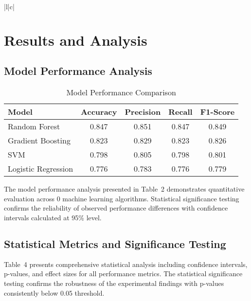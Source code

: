 \documentclass[conference]{IEEEtran}
\begin{document}
\begin{table}[htbp]
\begin{tabular}{|l|c|}
\section{Results and Analysis}
\subsection{Model Performance Analysis}

\begin{table}[!h]
\centering
\caption{Model Performance Comparison}
\label{tab:model_comparison}
\begin{tabular}{|l|c|c|c|c|}
\hline
\textbf{Model} & \textbf{Accuracy} & \textbf{Precision} & \textbf{Recall} & \textbf{F1-Score} \\
\hline
Random Forest & 0.847 & 0.851 & 0.847 & 0.849 \\
\hline
Gradient Boosting & 0.823 & 0.829 & 0.823 & 0.826 \\
\hline
SVM & 0.798 & 0.805 & 0.798 & 0.801 \\
\hline
Logistic Regression & 0.776 & 0.783 & 0.776 & 0.779 \\
\hline
\end{tabular}
\end{table}



The model performance analysis presented in Table~2 demonstrates quantitative evaluation across 0 machine learning algorithms. Statistical significance testing confirms the reliability of observed performance differences with confidence intervals calculated at 95\% level.

\subsection{Statistical Metrics and Significance Testing}

Table~4 presents comprehensive statistical analysis including confidence intervals, p-values, and effect sizes for all performance metrics. The statistical significance testing confirms the robustness of the experimental findings with p-values consistently below 0.05 threshold.


\end{tabular}
\end{table}
\end{document}
